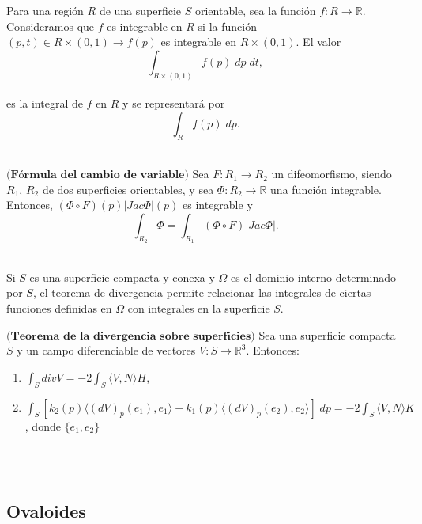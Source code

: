 \begin{definicion}
	Para una región $R$ de una superficie $S$ orientable, sea la función $f : R \to \mathbb{R}$. Consideramos que $f$ es integrable en $R$ si la función $(p,t) \in R \times (0,1) \to f(p)$ es integrable en $R \times (0,1)$. El valor
	${ }$\\
	$$ \int_{R \times (0,1)} f(p) \; dp \; dt, $$
	${ }$\\
	es la integral de $f$ en $R$ y se representará por
	${ }$\\
	$$ \int_{R} f(p) \; dp. $$
	${ }$\\

\begin{teorema}
	$\textbf{(Fórmula del cambio de variable)}$ Sea $F : R_1 \to R_2$ un difeomorfismo, siendo $R_1$, $R_2$ de dos superficies orientables, y sea $\Phi : R_2 \to \mathbb{R}$ una función integrable. Entonces, $(\Phi \circ F)(p)|Jac \Phi|(p)$ es integrable y
	\[
	\int_{R_2} \Phi = \int_{R_1} (\Phi \circ F)|Jac \Phi|.
	\]
\end{teorema}
${ }$\\


Si $S$ es una superficie compacta y conexa y $\Omega$ es el dominio interno determinado por $S$, el teorema de divergencia permite relacionar las integrales de ciertas funciones definidas en $\Omega$ con integrales en la superficie $S$.
${ }$\\

\begin{teorema}\label{teo:divergencia}
	$\textbf{(Teorema de la divergencia sobre superficies)}$ Sea una superficie compacta $S$ y un campo diferenciable de vectores $V : S \to \mathbb{R}^3$. Entonces:
	\begin{enumerate}
		\item $\int_S div V = -2 \int_S \langle V, N \rangle H$,
		\item $\int_S [k_2(p) \langle (dV)_p(e_1), e_1\rangle + k_1(p) \langle (dV)_p(e_2), e_2 \rangle ] \; dp = -2 \int_S \langle V, N \rangle K$, donde $\{ e_1, e_2 \}$
	\end{enumerate}
\end{teorema}
${ }$\\







${ }$\\
\subsection{Ovaloides}
${ }$\\


\end{definicion}
